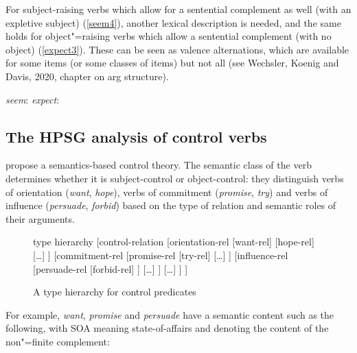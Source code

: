 \documentclass[output=paper
	        ,collection
	        ,collectionchapter
 	        ,biblatex
                ,babelshorthands
                ,newtxmath
                ,draftmode
                ,colorlinks, citecolor=brown
]{langscibook}
\begin{document}
\eal
{}
\zl

For subject-raising verbs which allow for a sentential complement as well (with an expletive subject) (\ref{seem4}), another lexical description is needed, and the same holds for object"=raising verbs which allow a sentential complement (with no object) (\ref{expect3}). These can be seen as valence alternations, which are available for some items (or some classes of items) but not all (see Wechsler, Koenig and Davis, 2020, chapter on arg structure).

\eal
\ex \emph{seem}:   \argst {}
\ex \emph{expect}: \argst {}
\zl

\subsection{The HPSG analysis of control verbs}

\citet{SagandPollard1991} propose a semantics-based control theory. The semantic class of the verb determines whether it is subject-control or object-control: they distinguish verbs of orientation (\emph{want}, \emph{hope}), verbs of commitment (\emph{promise}, \emph{try}) and verbs of influence (\emph{persuade}, \emph{forbid}) based on the type of relation and semantic roles of their arguments. 

\begin{figure}
	\begin{forest}type hierarchy
       [control-relation
      					[orientation-rel
      						[want-rel] 
      						 [hope-rel]
      						 [\ldots]   		
      					] 
      					[commitment-rel
      					 		[promise-rel
      					 			[try-rel]
      					 		[\ldots]
      					 	]
      					 	 [influence-rel
      					 		[persuade-rel
      					 			[forbid-rel]
      					 		]
      					 		[\ldots]
      					 	]
      					 	[\ldots]
      					]  
      	]
\end{forest}
\caption{\label{verb-hier3}A type hierarchy for control predicates}
\end{figure}

For example, \emph{want}, \emph{promise} and \emph{persuade} have a semantic content such as the following, with SOA meaning state-of-affairs and denoting the content of the non"=finite complement:

\eas
\zs
\end{document}
